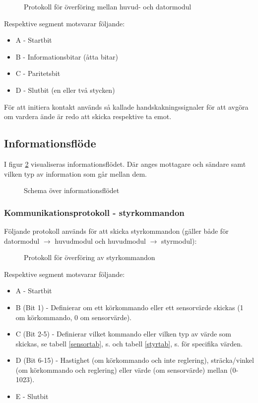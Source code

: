 \documentclass[11pt]{article}
\begin{document}
\begin{flushleft}
\begin{figure}[htbp]
\centering
\noindent\resizebox{.8\linewidth}{!}{
	}
	\caption{Protokoll för överföring mellan huvud- och datormodul \label{bluetooth}}	
\end{figure}

Respektive segment motsvarar följande:
\begin{itemize}
	\item A - Startbit
	\item B - Informationsbitar (åtta bitar)
	\item C - Paritetsbit
	\item D - Slutbit (en eller två stycken)
\end{itemize}

För att initiera kontakt används så kallade handskakningssignaler för att avgöra om vardera ände är redo att skicka respektive ta emot.

\subsection{Informationsflöde}
I figur \ref{informationFlow} visualiseras informationsflödet. Där anges mottagare och sändare samt vilken typ av information som går mellan dem.

\begin{figure}[htbp]
\centering
\noindent\resizebox{.8\linewidth}{!}{
	}
	\caption{Schema över informationsflödet\label{informationFlow}}	
\end{figure}

\subsubsection{Kommunikationsprotokoll - styrkommandon}
Följande protokoll används för att skicka styrkommandon (gäller både för datormodul $\rightarrow$ huvudmodul och huvudmodul $\rightarrow$ styrmodul):

\begin{figure}[htbp]
\centering
\noindent\resizebox{.8\linewidth}{!}{
	}
	\caption{Protokoll för överföring av styrkommandon\label{styrdata}}	
\end{figure}

Respektive segment motsvarar följande: 
\begin{itemize}
	\item A - Startbit
	\item B (Bit 1) - Definierar om ett körkommando eller ett sensorvärde skickas (1 om körkommando, 0 om sensorvärde).
	\item C (Bit 2-5) - Definierar vilket kommando eller vilken typ av värde som skickas, se tabell \ref{sensortab}, s.\pageref{sensortab} och tabell \ref{styrtab}, s.\pageref{styrtab} för specifika värden.
	\item D (Bit 6-15) - Hastighet (om körkommando och inte reglering), sträcka/vinkel (om körkommando och reglering) eller värde (om sensorvärde) mellan (0-1023).
	\item E - Slutbit
\end{itemize}


\end{flushleft}
\end{document}
